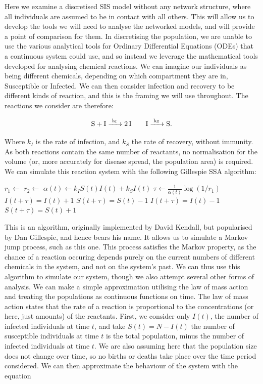 \documentclass[12pt,a4paper,openany,twoside]{book}
\begin{document}
Here we examine a discretised SIS model without any network structure, where all individuals are assumed to be in contact with all others. This will allow us to develop the tools we will need to analyse the networked models, and will provide a point of comparison for them. In discretising the population, we are unable to use the various analytical tools for Ordinary Differential Equations (ODEs) that a continuous system could use, and so instead we leverage the mathematical tools developed for analysing chemical reactions. We can imagine our individuals as being different chemicals, depending on which compartment they are in, Susceptible or Infected. We can then consider infection and recovery to be different kinds of reaction, and this is the framing we will use throughout. The reactions we consider are therefore:

\begin{equation}
	\ce{S + I ->[k_I] 2 I} \qquad \ce{I ->[k_S] S}.
\end{equation}

Where $k_I$ is the rate of infection, and $k_S$ the rate of recovery, without immunity. As both reactions contain the same number of reactants, no normalisation for the volume (or, more accurately for disease spread, the population area) is required. We can simulate this reaction system with the following Gillespie SSA algorithm:

\begin{algorithmic}
	\State $r_1 \gets$ 
	\State $r_2 \gets$ 
	\State $\alpha(t) \gets k_I S(t) I(t) + k_S I(t)$
	\State $\tau \gets \frac 1 {\alpha(t)} \log(1/r_1)$
		\State $I(t + \tau) = I(t) + 1$
		\State $S(t + \tau) = S(t) - 1$
	\Else
		\State $I(t + \tau) = I(t) - 1$
		\State $S(t + \tau) = S(t) + 1$
	\EndIf
\end{algorithmic}

This is an algorithm, originally implemented by David Kendall, but popularised by Dan Gillespie, and hence bears his name. It allows us to simulate a Markov jump process, such as this one. This process satisfies the Markov property, as the chance of a reaction occuring depends purely on the current numbers of different chemicals in the system, and not on the system's past. We can thus use this algorithm to simulate our system, though we also attempt several other forms of analysis. We can make a simple approximation utilising the law of mass action and treating the populations as continuous functions on time. The law of mass action states that the rate of a reaction is proportional to the concentrations (or here, just amounts) of the reactants. First, we consider only $I(t)$, the number of infected individuals at time $t$, and take $S(t) = N - I(t)$ the number of susceptible individuals at time $t$ is the total population, minus the number of infected individuals at time $t$. We are also assuming here that the population size does not change over time, so no births or deaths take place over the time period considered. We can then approximate the behaviour of the system with the equation
\end{document}
